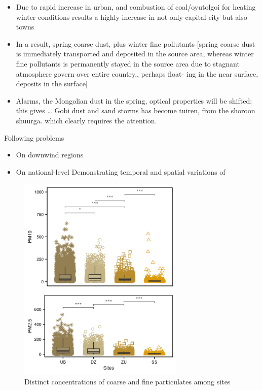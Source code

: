 \documentclass[
  11pt,
]{article}
\providecommand{\tightlist}{%
  \setlength{\itemsep}{0pt}\setlength{\parskip}{0pt}}
\begin{document}
\begin{itemize}
\tightlist
\item
  Due to rapid increase in urban, and combustion of coal/oyutolgoi for
  heating winter conditions results a highly increase in not only
  capital city but also towns
\item
  In a result, spring coarse dust, plus winter fine pollutants {[}spring
  coarse dust is immediately transported and deposited in the source
  area, whereas winter fine pollutants is permanently stayed in the
  source area due to stagnant atmosphere govern over entire country.,
  perhaps float- ing in the near surface, deposits in the surface{]}
\item
  Alarms, the Mongolian dust in the spring, optical properties will be
  shifted; this gives \ldots{} Gobi dust and sand storms has become
  tuiren, from the shoroon shuurga. which clearly requires the
  attention.
\end{itemize}

Following problems

\begin{itemize}
\tightlist
\item
  On downwind regions
\item
  On national-level Demonstrating temporal and spatial variations of
\end{itemize}

\newpage

\begin{figure}
\centering
\includegraphics[width=3.125in,height=\textheight,keepaspectratio]{images/figure_3.png}
\caption{Distinct concentrations of coarse and fine particulates among
sites}
\end{figure}
\end{document}
